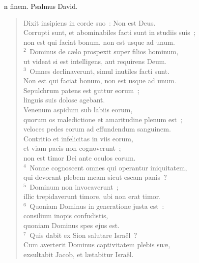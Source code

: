 \bchapter
{}n finem. Psalmus David. \begin{flushleft}\begin{verse}\vspace{6pt}Dixit insipiens in corde suo~: Non est Deus.\\ Corrupti sunt, et abominabiles facti sunt in studiis suis~;\\ non est qui faciat bonum, non est usque ad unum.\\
${}^{2}$~Dominus de c\ae lo prospexit super filios hominum,\\ ut videat si est intelligens, aut requirens Deum.\\
${}^{3}$~Omnes declinaverunt, simul inutiles facti sunt.\\ Non est qui faciat bonum, non est usque ad unum.\\ Sepulchrum patens est guttur eorum~;\\ linguis suis dolose agebant.\\ Venenum aspidum sub labiis eorum,\\ quorum os maledictione et amaritudine plenum est~;\\ veloces pedes eorum ad effundendum sanguinem.\\ Contritio et infelicitas in viis eorum,\\ et viam pacis non cognoverunt~;\\ non est timor Dei ante oculos eorum.\\
${}^{4}$~Nonne cognoscent omnes qui operantur iniquitatem,\\ qui devorant plebem meam sicut escam panis~?\\
${}^{5}$~Dominum non invocaverunt~;\\ illic trepidaverunt timore, ubi non erat timor.\\
${}^{6}$~Quoniam Dominus in generatione justa est~:\\ consilium inopis confudistis,\\ quoniam Dominus spes ejus est.\\
${}^{7}$~Quis dabit ex Sion salutare Isra\"el~?\\ Cum averterit Dominus captivitatem plebis su\ae ,\\ exsultabit Jacob, et l\ae tabitur Isra\"el.\end{verse}\end{flushleft}



